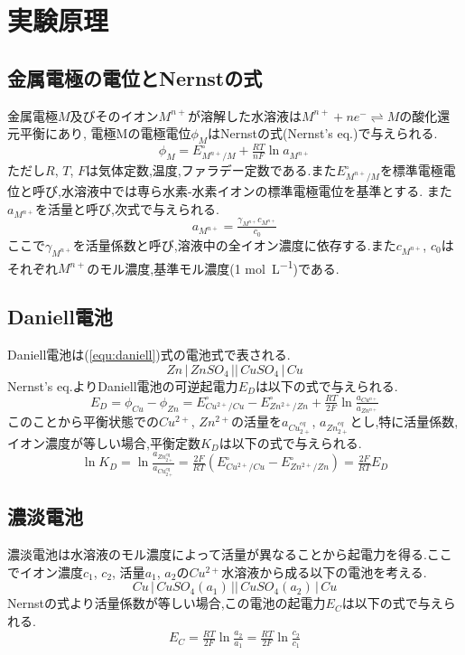 \section{実験原理}
\subsection{金属電極の電位とNernstの式}
金属電極$M$及びそのイオン$M^{n+}$が溶解した水溶液は$M^{n+}+ne^{-} \rightleftharpoons M$の酸化還元平衡にあり,
電極Mの電極電位$\phi_M$はNernstの式(Nernst's eq.)で与えられる.
\begin{equation}
  \label{equ:nernst}
  \phi_M = E^{\circ}_{M^{n+}/M} + \tfrac{RT}{nF} \ln a_{M^{n+}}
\end{equation}
ただし$R$, $T$, $F$は気体定数,温度,ファラデー定数である.また$E^{\circ}_{M^{n+}/M}$を標準電極電位と呼び,水溶液中では専ら水素-水素イオンの標準電極電位を基準とする.
また$a_{M^{n+}}$を活量と呼び,次式で与えられる.
\begin{equation}
  \label{equ:katuryo}
  a_{M^{n+}}=\tfrac{\gamma_{M^{n+}}c_{M^{n+}}}{c_0}
\end{equation}
ここで$\gamma_{M^{n+}}$を活量係数と呼び,溶液中の全イオン濃度に依存する.また$c_{M^{n+}}$, $c_0$はそれぞれ$M^{n+}$のモル濃度,基準モル濃度(1 \si{\mole.L^{-1}})である.
\subsection{Daniell電池}
Daniell電池は(\ref{equ:daniell})式の電池式で表される.
\begin{equation}
  \label{equ:daniell}
  Zn\,|\,ZnSO_4\,||\,CuSO_4\,|\,Cu
\end{equation}
Nernst's eq.よりDaniell電池の可逆起電力$E_D$は以下の式で与えられる.
\begin{equation}
  \label{equ:ED}
  E_D=\phi_{Cu} - \phi_{Zn}=E^{\circ}_{Cu^{2+}/Cu}-E^{\circ}_{Zn^{2+}/Zn}+\tfrac{RT}{2F} \ln \tfrac{a_{Cu^{n+}}}{a_{Zn^{n+}}}
\end{equation}
このことから平衡状態での$Cu^{2+}$, $Zn^{2+}$の活量を$a_{Cu_{2+}^{eq}}$, $a_{Zn_{2+}^{eq}}$とし,特に活量係数,イオン濃度が等しい場合,平衡定数$K_D$は以下の式で与えられる.
\begin{equation}
  \label{equ:K_D}
  \ln K_D=\ln \tfrac{a_{Zn_{2+}^{eq}}}{a_{Cu_{2+}^{eq}}}=\tfrac{2F}{RT} (E^{\circ}_{Cu^{2+}/Cu} - E^{\circ}_{Zn^{2+}/Zn})=\tfrac{2F}{RT} E_D
\end{equation}
\subsection{濃淡電池}
濃淡電池は水溶液のモル濃度によって活量が異なることから起電力を得る.ここでイオン濃度$c_1$, $c_2$, 活量$a_1$, $a_2$の$Cu^{2+}$水溶液から成る以下の電池を考える.
\begin{equation}
  \label{equ:noutandenti}
  Cu\,|\,CuSO_4(a_1)\,||\,CuSO_4(a_2)\,|\,Cu
\end{equation}
Nernstの式より活量係数が等しい場合,この電池の起電力$E_C$は以下の式で与えられる.
\begin{equation}
  \label{equ:noutan}
  E_C=\tfrac{RT}{2F} \ln \tfrac{a_2}{a_1} = \tfrac{RT}{2F} \ln \tfrac{c_2}{c_1}
\end{equation}